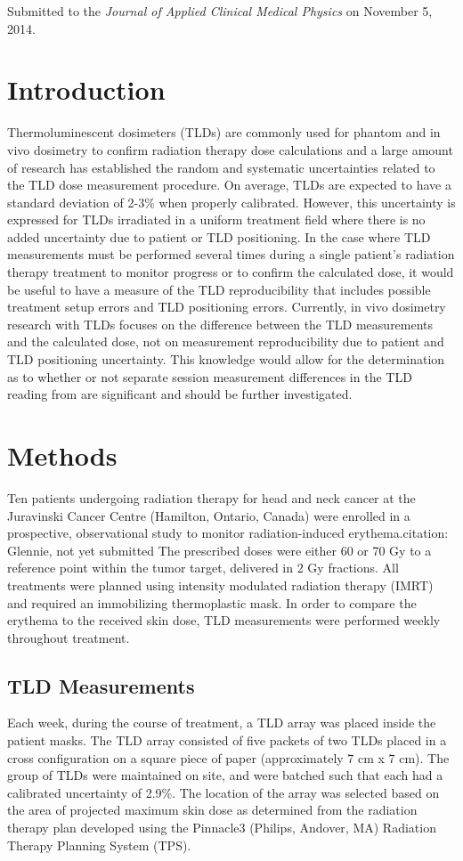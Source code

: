\noindent Submitted to the \textit{Journal of Applied Clinical Medical Physics} on November 5, 2014.

\section{Introduction}
Thermoluminescent dosimeters (TLDs) are commonly used for phantom and in vivo dosimetry to confirm radiation therapy dose calculations\cite{Essers1999,Mijnheer2013} and a large amount of research has established the random and systematic uncertainties related to the TLD dose measurement procedure.\cite{Kirby1992,Mijnheer1987} On average, TLDs are expected to have a standard deviation of 2-3\% when properly calibrated.\cite{Essers1999,Ostwald1995} However, this uncertainty is expressed for TLDs irradiated in a uniform treatment field where there is no added uncertainty due to patient or TLD positioning. In the case where TLD measurements must be performed several times during a single patient’s radiation therapy treatment to monitor progress or to confirm the calculated dose, it would be useful to have a measure of the TLD reproducibility that includes possible treatment setup errors and TLD positioning errors. Currently, in vivo dosimetry research with TLDs focuses on the difference between the TLD measurements and the calculated dose,\cite{Ruden1976,Leunens1990,Tung2004} not on measurement reproducibility due to patient and TLD positioning uncertainty. This knowledge would allow for the determination as to whether or not separate session measurement differences in the TLD reading from are significant and should be further investigated.

\section{Methods}
Ten patients undergoing radiation therapy for head and neck cancer at the Juravinski Cancer Centre (Hamilton, Ontario, Canada) were enrolled in a prospective, observational study to monitor radiation-induced erythema.{citation: Glennie, not yet submitted} The prescribed doses were either 60 or 70 Gy to a reference point within the tumor target, delivered in 2 Gy fractions. All treatments were planned using intensity modulated radiation therapy (IMRT) and required an immobilizing thermoplastic mask. In order to compare the erythema to the received skin dose, TLD measurements were performed weekly throughout treatment.

\subsection{TLD Measurements}
Each week, during the course of treatment, a TLD array was placed inside the patient masks. The TLD array consisted of five packets of two TLDs placed in a cross configuration on a square piece of paper (approximately 7 cm x 7 cm). The group of TLDs were maintained on site, and were batched such that each had a calibrated uncertainty of 2.9\%. The location of the array was selected based on the area of projected maximum skin dose as determined from the radiation therapy plan developed using the Pinnacle3 (Philips, Andover, MA) Radiation Therapy Planning System (TPS).

